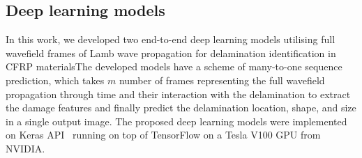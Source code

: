 \subsection{Deep learning models}
\label{proposed_approach}
\begin{sloppypar}
	In this work, we developed two end-to-end deep learning models utilising full wavefield frames of Lamb wave propagation for delamination identification in CFRP materials\DIFdelbegin {}\DIFdelend \DIFaddbegin {}\DIFaddend The developed models have a scheme of many-to-one sequence prediction, which takes \(m\) number of frames representing the full wavefield propagation through time and their interaction with the delamination to extract the damage features and finally predict the delamination location, shape, and size in a single output image.
	The proposed deep learning models were implemented on Keras API~\cite{chollet2015keras} running on top of TensorFlow on a Tesla V100 GPU from NVIDIA.
	\DIFdelbegin %
{%
} %
{%
} %
{%
}
\DIFdelend 


\end{sloppypar}

